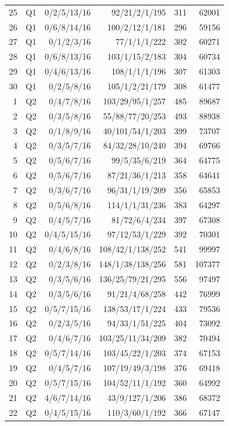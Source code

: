 \begin{longtable}{rrrrrr}
25 & Q1 & 0/2/5/13/16 & 92/21/2/1/195 & 311 & 62001\\
26 & Q1 & 0/6/8/14/16 & 100/2/12/1/181 & 296 & 59156\\
27 & Q1 & 0/1/2/3/16 & 77/1/1/1/222 & 302 & 60271\\
28 & Q1 & 0/6/8/13/16 & 103/1/15/2/183 & 304 & 60734\\
29 & Q1 & 0/4/6/13/16 & 108/1/1/1/196 & 307 & 61303\\
30 & Q1 & 0/2/5/8/16 & 105/1/2/21/179 & 308 & 61477\\
1 & Q2 & 0/4/7/8/16 & 103/29/95/1/257 & 485 & 89687\\
2 & Q2 & 0/3/5/8/16 & 55/88/77/20/253 & 493 & 88938\\
3 & Q2 & 0/1/8/9/16 & 40/101/54/1/203 & 399 & 73707\\
4 & Q2 & 0/3/5/7/16 & 84/32/28/10/240 & 394 & 69766\\
5 & Q2 & 0/5/6/7/16 & 99/5/35/6/219 & 364 & 64775\\
6 & Q2 & 0/5/6/7/16 & 87/21/36/1/213 & 358 & 64641\\
7 & Q2 & 0/3/6/7/16 & 96/31/1/19/209 & 356 & 65853\\
8 & Q2 & 0/5/6/8/16 & 114/1/1/31/236 & 383 & 64297\\
9 & Q2 & 0/4/5/7/16 & 81/72/6/4/234 & 397 & 67308\\
10 & Q2 & 0/4/5/15/16 & 97/12/53/1/229 & 392 & 70301\\
11 & Q2 & 0/4/6/8/16 & 108/42/1/138/252 & 541 & 99997\\
12 & Q2 & 0/2/3/8/16 & 148/1/38/138/256 & 581 & 107377\\
13 & Q2 & 0/3/5/6/16 & 136/25/79/21/295 & 556 & 97497\\
14 & Q2 & 0/3/5/6/16 & 91/21/4/68/258 & 442 & 76999\\
15 & Q2 & 0/5/7/15/16 & 138/53/17/1/224 & 433 & 79536\\
16 & Q2 & 0/2/3/5/16 & 94/33/1/51/225 & 404 & 73092\\
17 & Q2 & 0/4/6/7/16 & 103/25/11/34/209 & 382 & 70494\\
18 & Q2 & 0/5/7/14/16 & 103/45/22/1/203 & 374 & 67153\\
19 & Q2 & 0/4/5/7/16 & 107/19/49/3/198 & 376 & 69418\\
20 & Q2 & 0/5/7/15/16 & 104/52/11/1/192 & 360 & 64992\\
21 & Q2 & 4/6/7/14/16 & 43/9/127/1/206 & 386 & 68372\\
22 & Q2 & 0/4/5/15/16 & 110/3/60/1/192 & 366 & 67147\\

\end{longtable}
